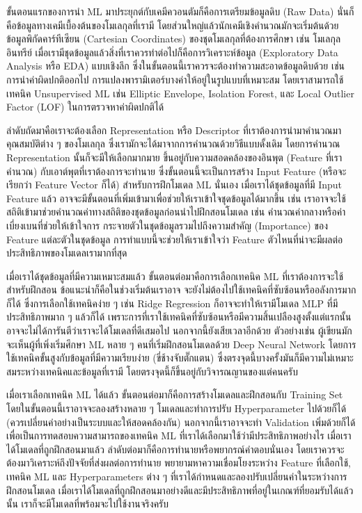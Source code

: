 ขั้นตอนแรกของการนำ ML มาประยุกต์กับเคมีควอนตัมก็คือการเตรียมข้อมูลดิบ (Raw Data) นั่นก็คือข้อมูลทางเคมีเบื้องต้นของโมเลกุลที่เรามี 
โดยส่วนใหญ่แล้วนักเคมีเชิงคำนวณมักจะเริ่มต้นด้วยข้อมูลพิกัดคาร์ทีเซียน (Cartesian Coordinates) ของชุดโมเลกุลที่ต้องการศึกษา เช่น 
โมเลกุลอินทรีย์ เมื่อเรามีชุดข้อมูลแล้วสิ่งที่เราควรทำต่อไปก็คือการวิเคราะห์ข้อมูล (Exploratory Data Analysis หรือ EDA) แบบเชิงลึก 
ซึ่งในขั้นตอนนี้เราควรจะต้องทำความสะอาดข้อมูลดิบด้วย เช่น การนำค่าผิดปกติออกไป การแปลงพารามิเตอร์บางค่าให้อยู่ในรูปแบบที่เหมาะสม 
โดยเราสามารถใช้เทคนิค Unsupervised ML เช่น Elliptic Envelope, Isolation Forest, และ Local Outlier Factor (LOF)
ในการตรวจหาค่าผิดปกติได้

ลำดับถัดมาคือเราจะต้องเลือก Representation หรือ Descriptor ที่เราต้องการนำมาคำนวณมาคุณสมบัติต่าง ๆ ของโมเลกุล 
ซึ่งเรามักจะได้มาจากการคำนวณด้วยวิธีแบบดั้งเดิม โดยการคำนวณ Representation นั้นก็จะมีให้เลือกมากมาย ขึ้นอยู่กับความสอดคล้องของอินพุต 
(Feature ที่เราคำนวณ) กับเอาต์พุตที่เราต้องการจะทำนาย ซึ่งขั้นตอนนี้จะเป็นการสร้าง Input Feature (หรือจะเรียกว่า Feature Vector ก็ได้) 
สำหรับการฝึกโมเดล ML นั่นเอง เมื่อเราได้ชุดข้อมูลที่มี Input Feature แล้ว อาจจะมีขั้นตอนที่เพิ่มเข้ามาเพื่อช่วยให้เราเข้าใจชุดข้อมูลได้มากขึ้น 
เช่น เราอาจจะใช้สถิติเข้ามาช่วยคำนวณค่าทางสถิติของชุดข้อมูลก่อนนำไปฝึกสอนโมเดล เช่น คำนวณค่ากลางหรือค่าเบี่ยงเบนที่ช่วยให้เข้าใจการ%
กระจายตัวในชุดข้อมูลรวมไปถึงความสำคัญ (Importance) ของ Feature แต่ละตัวในชุดข้อมูล การทำแบบนี้จะช่วยให้เราเข้าใจว่า Feature 
ตัวไหนที่น่าจะมีผลต่อประสิทธิภาพของโมเดลเรามากที่สุด 

เมื่อเราได้ชุดข้อมูลที่มีความเหมาะสมแล้ว ขั้นตอนต่อมาคือการเลือกเทคนิค ML ที่เราต้องการจะใช้สำหรับฝึกสอน ข้อแนะนำก็คือในช่วงเริ่มต้นเราอาจ%
จะยังไม่ต้องไปใช้เทคนิคที่ซับซ้อนหรืออลังการมากก็ได้ ซึ่งการเลือกใช้เทคนิคง่าย ๆ เช่น Ridge Regression ก็อาจจะทำให้เรามีโมเดล MLP 
ที่มีประสิทธิภาพมาก ๆ แล้วก็ได้ เพราะการที่เราใช้เทคนิคที่ซับซ้อนหรือมีความสิ้นเปลืองสูงตั้งแต่แรกนั้นอาจจะไม่ได้การันตีว่าเราจะได้โมเดลที่ดีเสมอไป 
นอกจากนี้ยังเสียเวลาอีกด้วย ตัวอย่างเช่น ผู้เขียนมักจะเห็นผู้ที่เพิ่งเริ่มศึกษา ML หลาย ๆ คนที่เริ่มฝึกสอนโมเดลด้วย Deep Neural Network 
โดยการใช้เทคนิคขั้นสูงกับข้อมูลที่มีความเรียบง่าย (ขี่ช้างจับตั๊กแตน) ซึ่งตรงจุดนี้บางครั้งมันก็มีความไม่เหมาะสมระหว่างเทคนิคและข้อมูลที่เรามี 
โดยตรงจุดนี้ก็ขึ้นอยู่กับวิจารณญานของแต่คนครับ 

เมื่อเราเลือกเทคนิค ML ได้แล้ว ขั้นตอนต่อมาก็คือการสร้างโมเดลและฝึกสอนกับ Training Set โดยในขั้นตอนนี้เราอาจจะลองสร้างหลาย ๆ 
โมเดลและทำการปรับ Hyperparameter ไปด้วยก็ได้ (ควรเปลี่ยนค่าอย่างเป็นระบบและให้สอดคล้องกัน) นอกจากนี้เราอาจจะทำ Validation 
เพิ่มด้วยก็ได้เพื่อเป็นการทดสอบความสามารถของเทคนิค ML ที่เราได้เลือกมาใช้ว่ามีประสิทธิภาพอย่างไร เมื่อเราได้โมเดลที่ถูกฝึกสอนมาแล้ว 
ลำดับต่อมาก็คือการทำนายหรือพยากรณ์คำตอบนั่นเอง โดยเราควรจะต้องมาวิเคราะห์ถึงปัจจัยที่ส่งผลต่อการทำนาย พยายามหาความเชื่อมโยงระหว่าง 
Feature ที่เลือกใช้, เทคนิค ML และ Hyperparameters ต่าง ๆ ที่เราได้กำหนดและลองปรับเปลี่ยนค่าในระหว่างการฝึกสอนโมเดล 
เมื่อเราได้โมเดลที่ถูกฝึกสอนมาอย่างดีและมีประสิทธิภาพที่อยู่ในเกณฑ์ที่ยอมรับได้แล้วนั้น เราก็จะมีโมเดลที่พร้อมจะไปใช้งานจริงครับ

